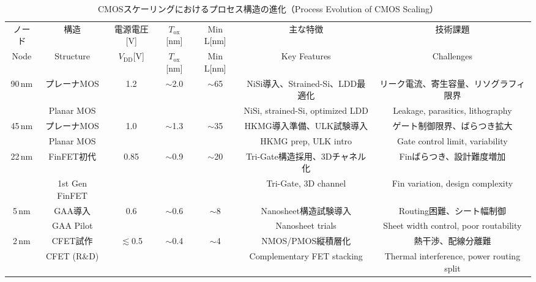 \begin{table*}[t]
  \centering
  \caption{CMOSスケーリングにおけるプロセス構造の進化（Process Evolution of CMOS Scaling）}
  \label{tab:process_evolution}
  \scriptsize
  \setlength{\tabcolsep}{4pt}
  \renewcommand{\arraystretch}{1.1}
  \begin{tabular}{ccccccc}
    \toprule
    ノード & 構造 & 電源電圧[V] & $T_\mathrm{ox}$[nm] & Min L[nm] & 主な特徴 & 技術課題 \\
    Node & Structure & $V_\mathrm{DD}$[V] & $T_\mathrm{ox}$[nm] & Min L[nm] & Key Features & Challenges \\
    \midrule
    90\,nm & プレーナMOS & 1.2 & $\sim$2.0 & $\sim$65 & NiSi導入、Strained-Si、LDD最適化 & リーク電流、寄生容量、リソグラフィ限界 \\
           & Planar MOS &     &              &           & NiSi, strained-Si, optimized LDD & Leakage, parasitics, lithography \\[2pt]
    45\,nm & プレーナMOS & 1.0 & $\sim$1.3 & $\sim$35 & HKMG導入準備、ULK試験導入 & ゲート制御限界、ばらつき拡大 \\
           & Planar MOS &     &             &          & HKMG prep, ULK intro & Gate control limit, variability \\[2pt]
    22\,nm & FinFET初代 & 0.85 & $\sim$0.9 & $\sim$20 & Tri-Gate構造採用、3Dチャネル化 & Finばらつき、設計難度増加 \\
           & 1st Gen FinFET & & & & Tri-Gate, 3D channel & Fin variation, design complexity \\[2pt]
    5\,nm & GAA導入 & 0.6 & $\sim$0.6 & $\sim$8 & Nanosheet構造試験導入 & Routing困難、シート幅制御 \\
           & GAA Pilot & & & & Nanosheet trials & Sheet width control, poor routability \\[2pt]
    2\,nm & CFET試作 & $\lesssim$0.5 & $\sim$0.4 & $\sim$4 & NMOS/PMOS縦積層化 & 熱干渉、配線分離難 \\
           & CFET (R\&D) & & & & Complementary FET stacking & Thermal interference, power routing split \\
    \bottomrule
  \end{tabular}
\end{table*}
